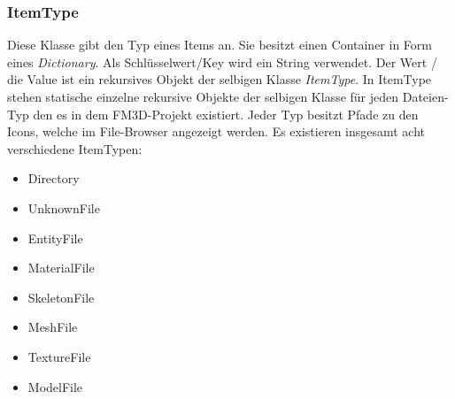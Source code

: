 \subsubsection{ItemType}
Diese Klasse gibt den Typ eines Items an. Sie besitzt einen Container in Form eines \textit{Dictionary}. Als Schlüsselwert/Key wird ein String verwendet. Der Wert / die Value ist ein rekursives Objekt der selbigen Klasse \textit{ItemType}.
In ItemType stehen statische einzelne rekursive Objekte der selbigen Klasse für jeden Dateien-Typ den es in dem FM3D-Projekt existiert.
Jeder Typ besitzt Pfade zu den Icons, welche im File-Browser angezeigt werden.  Es existieren insgesamt acht verschiedene ItemTypen:
\begin{itemize}
	\item Directory
	\item UnknownFile
	\item EntityFile
	\item MaterialFile
	\item SkeletonFile
	\item MeshFile
	\item TextureFile
	\item ModelFile
\end{itemize}


